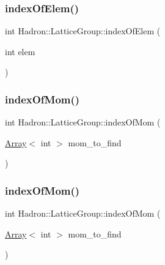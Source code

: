 \subsubsection{\texorpdfstring{indexOfElem()}{indexOfElem()}\hspace{0.1cm}{\footnotesize\ttfamily [2/2]}}
{\footnotesize\ttfamily int Hadron\+::\+Lattice\+Group\+::index\+Of\+Elem (\begin{DoxyParamCaption}\item[{int}]{elem }\end{DoxyParamCaption})\hspace{0.3cm}{\ttfamily [inline]}}

\mbox{\label{structHadron_1_1LatticeGroup_a49927e4a4d386b2e3eed6f3b5c1ee76d}} 
\subsubsection{\texorpdfstring{indexOfMom()}{indexOfMom()}\hspace{0.1cm}{\footnotesize\ttfamily [1/2]}}
{\footnotesize\ttfamily int Hadron\+::\+Lattice\+Group\+::index\+Of\+Mom (\begin{DoxyParamCaption}\item[{\mbox{\hyperlink{classXMLArray_1_1Array}{Array}}$<$ int $>$}]{mom\+\_\+to\+\_\+find }\end{DoxyParamCaption})\hspace{0.3cm}{\ttfamily [inline]}}

\mbox{\label{structHadron_1_1LatticeGroup_a49927e4a4d386b2e3eed6f3b5c1ee76d}} 
\subsubsection{\texorpdfstring{indexOfMom()}{indexOfMom()}\hspace{0.1cm}{\footnotesize\ttfamily [2/2]}}
{\footnotesize\ttfamily int Hadron\+::\+Lattice\+Group\+::index\+Of\+Mom (\begin{DoxyParamCaption}\item[{\mbox{\hyperlink{classXMLArray_1_1Array}{Array}}$<$ int $>$}]{mom\+\_\+to\+\_\+find }\end{DoxyParamCaption})\hspace{0.3cm}{\ttfamily [inline]}}

